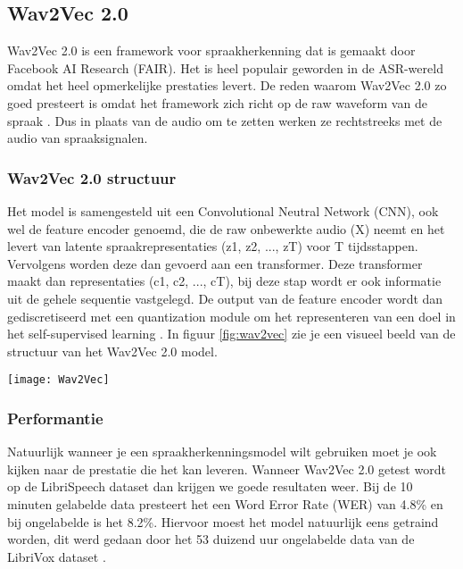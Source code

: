 \subsection{Wav2Vec 2.0}
Wav2Vec 2.0 is een framework voor spraakherkenning dat is gemaakt door Facebook AI Research (FAIR). Het is heel populair geworden in de ASR-wereld omdat het heel opmerkelijke prestaties levert. De reden waarom Wav2Vec 2.0 zo goed presteert is omdat het framework zich richt op de raw waveform van de spraak \autocite{baevski2020wav2vec}. Dus in plaats van de audio om te zetten werken ze rechtstreeks met de audio van spraaksignalen. 

\subsubsection{Wav2Vec 2.0 structuur}
Het model is samengesteld uit een Convolutional Neutral Network (CNN), ook wel de feature encoder genoemd, die de raw onbewerkte audio (X) neemt en het levert van latente spraakrepresentaties (z1, z2, ..., zT) voor T tijdsstappen. Vervolgens worden deze dan gevoerd aan een transformer. Deze transformer maakt dan representaties (c1, c2, ..., cT), bij deze stap wordt er ook informatie uit de gehele sequentie vastgelegd. De output van de feature encoder wordt dan gediscretiseerd met een quantization module om het representeren van een doel in het self-supervised learning \autocite{baevski2020wav2vec}. In figuur \ref{fig:wav2vec} zie je een visueel beeld van de structuur van het Wav2Vec 2.0 model.

\begin{center}
    \texttt{[image: Wav2Vec]}
    \label{fig:wav2vec}
\end{center}

\subsubsection{Performantie}
Natuurlijk wanneer je een spraakherkenningsmodel wilt gebruiken moet je ook kijken naar de prestatie die het kan leveren. Wanneer Wav2Vec 2.0 getest wordt op de LibriSpeech dataset dan krijgen we goede resultaten weer. Bij de 10 minuten gelabelde data presteert het een Word Error Rate (WER) van 4.8\% en bij ongelabelde is het 8.2\%. Hiervoor moest het model natuurlijk eens getraind worden, dit werd gedaan door het 53 duizend uur ongelabelde data van de LibriVox dataset \autocite{baevski2020wav2vec}. 

